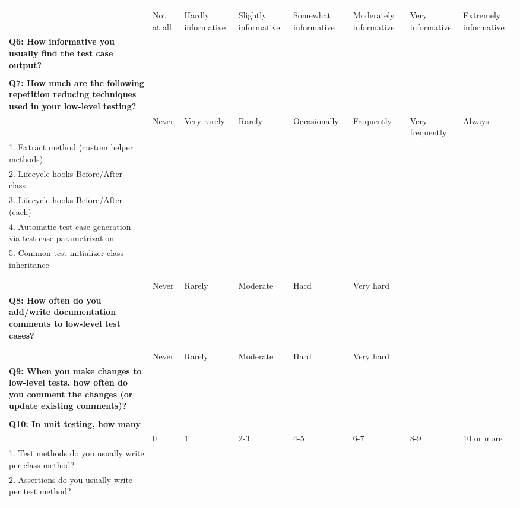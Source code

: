 \begin{table}
{\begin{tabular}{p{20.0cm}*{7}{p{2.0cm}}}
            & & & & & & \\
            & Not at all & Hardly informative & Slightly informative & Somewhat informative & Moderately informative & Very informative & Extremely informative \\
            \textbf{Q6: How informative you usually find the test case output?} & \\
            & \\ \hline

            \textbf{Q7: How much are the following repetition reducing techniques used in your low-level testing?} & & & & & & \\
            & Never & Very rarely & Rarely & Occasionally & Frequently & Very \newline frequently & Always \\
            1. Extract method (custom helper methods) & \\
            2. Lifecycle hooks Before/After -class & \\
            3. Lifecycle hooks Before/After (each) & \\
            4. Automatic test case generation via test case parametrization & \\
            5. Common test initializer class inheritance & \\
            & \\ \hline

            & & & & & & \\
            & Never & Rarely & Moderate & Hard & Very hard & & \\
            \textbf{Q8: How often do you add/write documentation comments to low-level test cases?} & \\
            & \\ \hline

            & & & & & & \\
            & Never & Rarely & Moderate & Hard & Very hard & & \\
            \textbf{Q9: When you make changes to low-level tests, how often do you comment the changes (or update existing comments)?} & \\
            & \\ \hline

            \textbf{Q10: In unit testing, how many} & & & & & & \\
            & 0 & 1 & 2-3 & 4-5 & 6-7 &  8-9 & 10 or more \\
            1. Test methods do you usually write per class method? & \\
            2. Assertions do you usually write per test method? & \\
            & \\ \hline


\end{tabular}}
\end{table}
